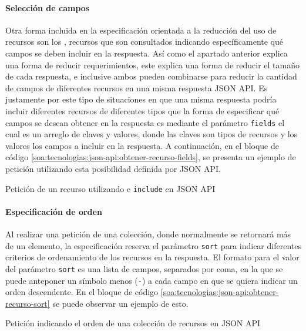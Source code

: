 \paragraph{Selección de campos}

Otra forma incluida en la especificación orientada a la reducción del uso de recursos son los , recursos que son consultados indicando específicamente qué campos se deben incluir en la respuesta. Así como el apartado anterior explica una forma de reducir requerimientos, este explica una forma de reducir el tamaño de cada respuesta, e inclusive ambos pueden combinarse para reducir la cantidad de campos de diferentes recursos en una misma respuesta JSON API. Es justamente por este tipo de situaciones en que una misma respuesta podría incluir diferentes recursos de diferentes tipos que la forma de especificar qué campos se desean obtener en la respuesta es mediante el parámetro \texttt{fields} el cual es un arreglo de claves y valores, donde las claves son tipos de recursos y los valores los campos a incluir en la respuesta. A continuación, en el bloque de código \autoref{soa:tecnologias:json-api:obtener-recurso-fields}, se presenta un ejemplo de petición utilizando esta posibilidad definida por JSON API.

\begin{listing}
  \caption{Petición de un recurso utilizando  e \texttt{include} en JSON API}
  \label{soa:tecnologias:json-api:obtener-recurso-fields}
\end{listing}

\paragraph{Especificación de orden}

Al realizar una petición de una colección, donde normalmente se retornará más de un elemento, la especificación reserva el parámetro \texttt{sort} para indicar diferentes criterios de ordenamiento de los recursos en la respuesta. El formato para el valor del parámetro \texttt{sort} es una lista de campos, separados por coma, en la que se puede anteponer un símbolo menos (\texttt{-}) a cada campo en que se quiera indicar un orden descendente. En el bloque de código \autoref{soa:tecnologias:json-api:obtener-recurso-sort} se puede observar un ejemplo de esto.

\begin{listing}
  \caption{Petición indicando el orden de una colección de recursos en JSON API}
  \label{soa:tecnologias:json-api:obtener-recurso-sort}
\end{listing}

